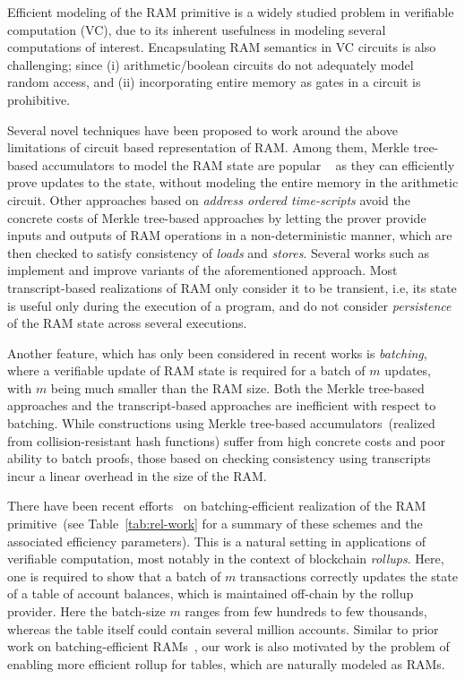 Efficient modeling of the RAM primitive is a widely studied problem in
verifiable computation (VC), due to its inherent usefulness in modeling several computations of interest.
Encapsulating RAM semantics in VC circuits is also challenging; since (i) arithmetic/boolean circuits do not
adequately model random access, and (ii) incorporating entire memory as gates in a circuit is prohibitive.

Several novel techniques have been proposed to work around the above limitations of circuit based representation
of RAM. Among them, Merkle tree-based accumulators to model the RAM state are popular
~\cite{EPRINT:BFRSBW13,compwithstate,C:BCTV14} as they can efficiently
prove updates to the state, without modeling the entire memory in the arithmetic circuit. Other
approaches based on {\em address ordered time-scripts} avoid the concrete costs of Merkle tree-based approaches
by letting the prover provide inputs and outputs of RAM operations in a non-deterministic manner, which
are then checked to satisfy consistency of {\em loads} and {\em stores}.
Several works such as \cite{NDSS:WSRBW15,USENIX:BCTV14,C:BCGTV13,SP:ZGKPP18} implement and improve variants
of the aforementioned approach. Most transcript-based realizations of RAM only consider it to be transient,
i.e, its state is useful only during the execution of a program, and do not consider {\em persistence} of the
RAM state across several executions. 

Another feature, which has only been considered in recent works
\cite{USENIX:OWWB20,CCS:CFHKKO22} is {\em batching}, where a verifiable update of RAM state is required
for a batch of $m$ updates, with $m$ being much smaller than the RAM size. Both the Merkle tree-based approaches
and the transcript-based approaches are inefficient with respect to batching.
While constructions using Merkle tree-based accumulators~(realized from collision-resistant hash functions) suffer from high concrete costs and poor
ability to batch proofs, those based on checking consistency using transcripts incur a linear overhead in the
size of the RAM.

\smallskip

 There have been recent efforts~\cite{USENIX:OWWB20,CCS:CFHKKO22} on batching-efficient
realization of the RAM primitive~(see Table~\ref{tab:rel-work} for a summary of these schemes and the associated efficiency parameters). This is a natural setting in applications of verifiable
computation, most notably in the context of blockchain {\em rollups}. Here, one is required
to show that a batch of $m$ transactions correctly updates the state of a table of account balances, which
is maintained off-chain by the rollup provider. Here the batch-size $m$ ranges from few hundreds to few
thousands, whereas the table itself could contain several million accounts.
Similar to prior work on batching-efficient RAMs~\cite{USENIX:OWWB20,CCS:CFHKKO22}, our work is also motivated
 by the problem of enabling more efficient rollup for tables, which are
naturally modeled as RAMs.

